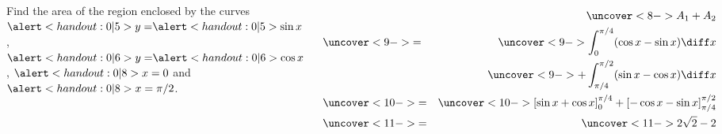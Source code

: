 \begin{frame}
\begin{example}[Example 5, p. 350]
\begin{columns}
Find the area of the region enclosed by the curves $\alert<handout:0| 5>{y =} \alert<handout:0| 5>{\sin x}$, $\alert<handout:0| 6>{y =} \alert<handout:0| 6>{\cos x}$, $\alert<handout:0| 8>{x = 0}$ and $\alert<handout:0| 8>{x = \pi/2}$.

\begin{eqnarray*}
&  & \uncover<8->{A_1 + A_2} \\
 & \uncover<9->{=} & \uncover<9->{\int_0^{\pi /4} (\cos x - \sin x )\diff x} \\
& & \qquad \uncover<9->{+ \int_{\pi /4}^{\pi /2} (\sin x - \cos x)\diff x} \\
 & \uncover<10->{=} & \uncover<10->{\left[ \sin x + \cos x \right]_0^{\pi / 4} + \left[ -\cos x - \sin x\right]_{\pi /4}^{\pi /2}}  \\
 & \uncover<11->{=} & \uncover<11->{2\sqrt{2} - 2}%
\end{eqnarray*}
\end{columns}
\end{example}
\end{frame}
